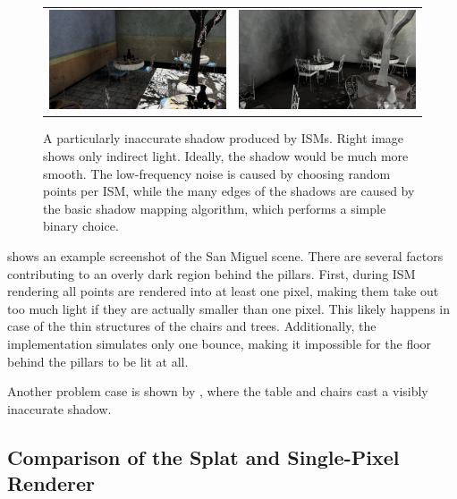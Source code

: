 \begin{figure}[htb]
\centering
  \begin{tabular}{@{}cc@{}}
    \includegraphics[width=.48\textwidth]{screenshots/san_miguel_ugly_shadow} &
    \includegraphics[width=.48\textwidth]{screenshots/san_miguel_ugly_shadow_gi_only}
  \end{tabular}
  \caption{A particularly inaccurate shadow produced by ISMs. Right image shows only indirect light. Ideally, the shadow would be much more smooth. The low-frequency noise is caused by choosing random points per ISM, while the many edges of the shadows are caused by the basic shadow mapping algorithm, which performs a simple binary choice.}
  \label{fig:results:san_miguel_ugly_shadow}
\end{figure}

 shows an example screenshot of the San Miguel scene. There are several factors contributing to an overly dark region behind the pillars. First, during ISM rendering all points are rendered into at least one pixel, making them take out too much light if they are actually smaller than one pixel. This likely happens in case of the thin structures of the chairs and trees. Additionally, the implementation simulates only one bounce, making it impossible for the floor behind the pillars to be lit at all.

Another problem case is shown by , where the table and chairs cast a visibly inaccurate shadow.


\subsection{Comparison of the Splat and Single-Pixel Renderer}
\label{sec:results:ism:comparison}

